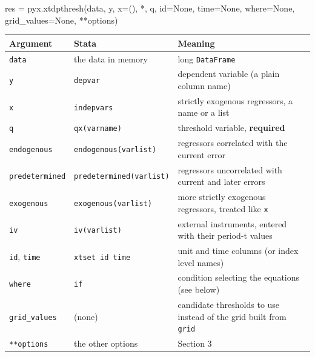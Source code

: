 \documentclass[
  10.5pt,
  a4paper,
]{article}
\newenvironment{Shaded}{}{}
\newcommand{\NormalTok}[1]{#1}
\newcounter{none} %
\begin{document}
\begin{Shaded}
\begin{Highlighting}[]
\NormalTok{res = pyx.xtdpthresh(data, y, x=(), *, q, id=None, time=None, where=None, grid\_values=None, **options)}
\end{Highlighting}
\end{Shaded}

{\def\LTcaptype{none} %
\begin{longtable}[]{@{}
  >{\raggedright\arraybackslash}p{}
  >{\raggedright\arraybackslash}p{}
  >{\raggedright\arraybackslash}p{}@{}}
\toprule\noalign{}
\begin{minipage}[b]{\linewidth}\raggedright
Argument
\end{minipage} & \begin{minipage}[b]{\linewidth}\raggedright
Stata
\end{minipage} & \begin{minipage}[b]{\linewidth}\raggedright
Meaning
\end{minipage} \\
\midrule\noalign{}
\endhead
\bottomrule\noalign{}
\endlastfoot
\texttt{data} & the data in memory & long \texttt{DataFrame} \\
\texttt{y} & \texttt{depvar} & dependent variable (a plain column
name) \\
\texttt{x} & \texttt{indepvars} & strictly exogenous regressors, a name
or a list \\
\texttt{q} & \texttt{qx(varname)} & threshold variable,
\textbf{required} \\
\texttt{endogenous} & \texttt{endogenous(varlist)} & regressors
correlated with the current error \\
\texttt{predetermined} & \texttt{predetermined(varlist)} & regressors
uncorrelated with current and later errors \\
\texttt{exogenous} & \texttt{exogenous(varlist)} & more strictly
exogenous regressors, treated like \texttt{x} \\
\texttt{iv} & \texttt{iv(varlist)} & external instruments, entered with
their period-t values \\
\texttt{id}, \texttt{time} & \texttt{xtset\ id\ time} & unit and time
columns (or index level names) \\
\texttt{where} & \texttt{if} & condition selecting the equations (see
below) \\
\texttt{grid\_values} & (none) & candidate thresholds to use instead of
the grid built from \texttt{grid} \\
\texttt{**options} & the other options & Section 3 \\
\end{longtable}
}
\end{document}
